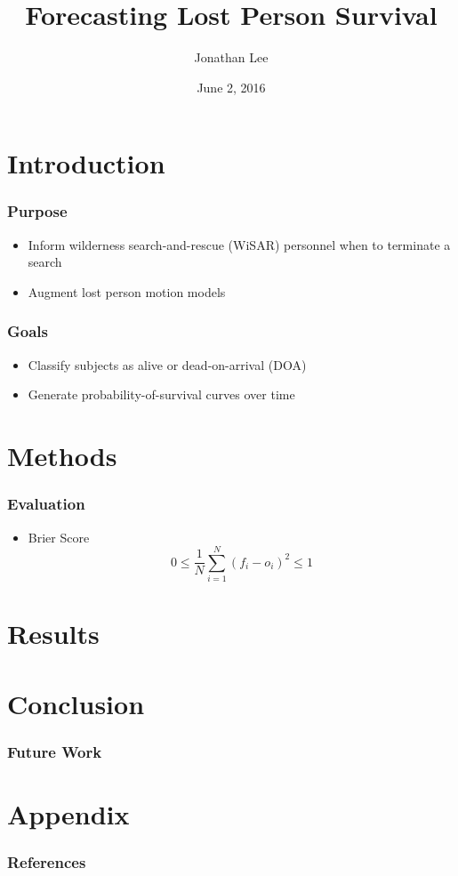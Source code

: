 \documentclass[serif,final,bigger]{beamer}
\title{Forecasting Lost Person Survival}
\author{Jonathan Lee}
\institute{TJHSST Computer Systems Lab}
\date{June 2, 2016}
\begin{document}
  \begin{frame}
    \titlepage
  \end{frame}
  \usebackgroundtemplate{}

  \section{Introduction}

  \begin{frame}
    \frametitle{Purpose}
    \begin{itemize}
      \item Inform wilderness search-and-rescue (WiSAR) personnel when to terminate a search
      \item Augment lost person motion models
    \end{itemize}
  \end{frame}

  \begin{frame}
    \frametitle{Goals}
    \begin{itemize}
      \item Classify subjects as alive or dead-on-arrival (DOA)
      \item Generate probability-of-survival curves over time
    \end{itemize}
  \end{frame}

  \section{Methods}

  \begin{frame}
    \frametitle{Evaluation}
    \begin{itemize}
      \item Brier Score
      $$0 \leq \frac{1}{N} \sum_{i=1}^N (f_i - o_i)^2 \leq 1$$
    \end{itemize}
  \end{frame}

  \section{Results}

  \section{Conclusion}

  \begin{frame}
    \frametitle{Future Work}
  \end{frame}

  \section{Appendix}

  \begin{frame}
    \frametitle{References}
  \end{frame}
\end{document}
